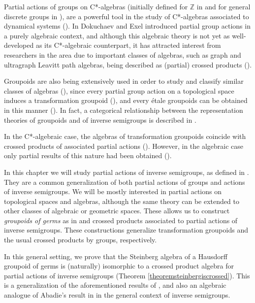 Partial actions of groups on C*-algebras (initially defined for $\mathbb{Z}$ in \cite{MR1276163} and for general discrete groups in \cite{MR1331978}), are a powerful tool in the study of C*-algebras associated to dynamical systems (\cite{MR3043025,MR3539347,MR1703078,MR3699170,MR3210558,MR3600124}). In \cite{MR2115083} Dokuchaev and Exel introduced partial group actions in a purely algebraic context, and although this algebraic theory is not yet as well-developed as its C*-algebraic counterpart, it has attracted interest from researchers in the area due to important classes of algebras, such as graph and ultragraph Leavitt path algebras, being described as (partial) crossed products (\cite{MR3196063, 1706.03628v2}).

Groupoids are also being extensively used in order to study and classify similar classes of algebras (\cite{MR3274831}), since every partial group action on a topological space induces a transformation groupoid (\cite{MR2045419}), and every étale groupoids can be obtained in this manner (\cite[Proposition 5.4]{MR2419901}). In fact, a categorical relationship between the representation theories of groupoids and of inverse semigroups is described in \cite{MR2969047}.

In the C*-algebraic case, the algebras of transformation groupoids coincide with crossed products of associated partial actions (\cite{MR2045419}). However, in the algebraic case only partial results of this nature had been obtained (\cite{MR3743184, arxiv1710.09723v1}). 

In this chapter we will study partial actions of inverse semigroups, as defined in \cite{MR3231479}. They are a common generalization of both partial actions of groups and actions of inverse semigroups. We will be mostly interested in partial actions on topological spaces and algebras, although the same theory can be extended to other classes of algebraic or geometric spaces. These allows us to construct \emph{groupoids of germs} as in \cite{MR2419901} and crossed products associated to partial actions of inverse semigroups. These constructions generalize transformation groupoids and the usual crossed products by groups, respectively.

In this general setting, we prove that the Steinberg algebra of a Hausdorff groupoid of germs is (naturally) isomorphic to a crossed product algebra for partial actions of inverse semigroups (Theorem \ref{theoremsteinbergiscrossed}). This is a generalization of the aforementioned results of \cite{MR3743184, arxiv1710.09723v1}, and also an algebraic analogue of Abadie's result in \cite{MR2045419} in the general context of inverse semigroups.

